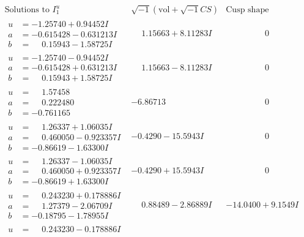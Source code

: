 \documentclass[1p]{elsarticle_modified}
\theoremstyle{definition}
\newcommand{\I}{\sqrt{-1}}
\begin{document}
$$\begin{array}{c|c|c}
\text{Solutions to }I^u_{1}& \I (\text{vol} + \sqrt{-1}CS) & \text{Cusp shape}\\
 \hline 
\begin{aligned}
u &= -1.25740 + 0.94452 I \\
a &= -0.615428 - 0.631213 I \\
b &= \phantom{-}0.15943 - 1.58725 I\end{aligned}
 & \phantom{-}1.15663 + 8.11283 I & \phantom{-0.000000 } 0 \\ \hline\begin{aligned}
u &= -1.25740 - 0.94452 I \\
a &= -0.615428 + 0.631213 I \\
b &= \phantom{-}0.15943 + 1.58725 I\end{aligned}
 & \phantom{-}1.15663 - 8.11283 I & \phantom{-0.000000 } 0 \\ \hline\begin{aligned}
u &= \phantom{-}1.57458\phantom{ +0.000000I} \\
a &= \phantom{-}0.222480\phantom{ +0.000000I} \\
b &= -0.761165\phantom{ +0.000000I}\end{aligned}
 & -6.86713\phantom{ +0.000000I} & \phantom{-0.000000 } 0 \\ \hline\begin{aligned}
u &= \phantom{-}1.26337 + 1.06035 I \\
a &= \phantom{-}0.460050 - 0.923357 I \\
b &= -0.86619 - 1.63300 I\end{aligned}
 & -0.4290 - 15.5943 I & \phantom{-0.000000 } 0 \\ \hline\begin{aligned}
u &= \phantom{-}1.26337 - 1.06035 I \\
a &= \phantom{-}0.460050 + 0.923357 I \\
b &= -0.86619 + 1.63300 I\end{aligned}
 & -0.4290 + 15.5943 I & \phantom{-0.000000 } 0 \\ \hline\begin{aligned}
u &= \phantom{-}0.243230 + 0.178886 I \\
a &= \phantom{-}1.27379 - 2.06709 I \\
b &= -0.18795 - 1.78955 I\end{aligned}
 & \phantom{-}0.88489 - 2.86889 I & -14.0400 + 9.1549 I \\ \hline\begin{aligned}
u &= \phantom{-}0.243230 - 0.178886 I \\

\end{aligned}
\end{array}$$
\end{document}
